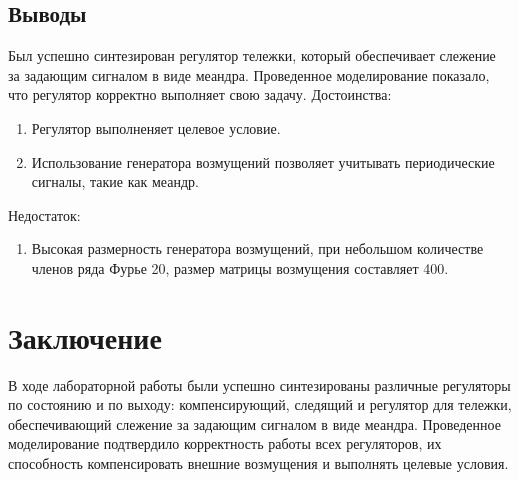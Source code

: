 \subsection{Выводы}

Был успешно синтезирован регулятор тележки, который обеспечивает 
слежение за задающим сигналом в виде меандра. Проведенное моделирование показало, 
что регулятор корректно выполняет свою задачу. 
Достоинства:
\begin{enumerate}
    \item Регулятор выполненяет целевое условие.
    \item Использование генератора возмущений позволяет учитывать 
    периодические сигналы, такие как меандр.
\end{enumerate}
Недостаток:
\begin{enumerate}
    \item Высокая размерность генератора возмущений, при небольшом
    количестве членов ряда Фурье 20, размер матрицы возмущения составляет 400.
\end{enumerate}




\section{Заключение}

В ходе лабораторной работы были успешно синтезированы различные 
регуляторы по состоянию и по выходу: компенсирующий, следящий и регулятор для тележки, 
обеспечивающий слежение за задающим сигналом в виде меандра. 
Проведенное моделирование подтвердило корректность работы всех 
регуляторов, их способность компенсировать внешние возмущения 
и выполнять целевые условия.